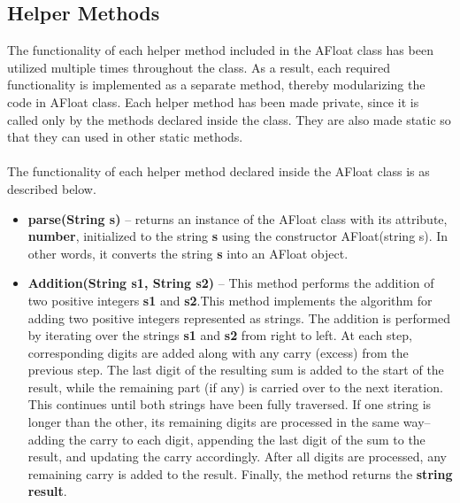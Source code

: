 \documentclass[a4paper,12pt]{article}
\begin{document}
\subsection{Helper Methods}
The functionality of each helper method included in the AFloat class has been utilized multiple times throughout the class. As a result, each required functionality is implemented as a separate method, thereby modularizing the code in AFloat class. Each helper method has been made private, since it is called only by the methods declared inside the class. They are also made static so that they can used in other static methods.\\\\
The functionality of each helper method declared inside the AFloat class is as described below.

\begin{itemize}
    \item \textbf{parse(String s)} -- returns an instance of the AFloat class with its attribute, \textbf{number}, initialized to the string \textbf{s} using the constructor AFloat(string s). In other words, it converts the string \textbf{s} into an AFloat object.\\

    \item \textbf{Addition(String s1, String s2)} -- This method performs the addition of two positive integers \textbf{s1} and \textbf{s2}.This method implements the algorithm for adding two positive integers represented as strings. The addition is performed by iterating over the strings \textbf{s1} and \textbf{s2} from right to left. At each step, corresponding digits are added along with any carry (excess) from the previous step. The last digit of the resulting sum is added to the start of the result, while the remaining part (if any) is carried over to the next iteration. This continues until both strings have been fully traversed. If one string is longer than the other, its remaining digits are processed in the same way--adding the carry to each digit, appending the last digit of the sum to the result, and updating the carry accordingly. After all digits are processed, any remaining carry is added to the result. Finally, the method returns the \textbf{string result}.\\


\end{itemize}
\end{document}
